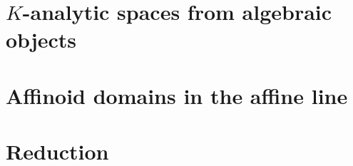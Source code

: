 \section{$K$-analytic spaces from algebraic objects} \label{sec:berkovich_analytification_of_schemes}



\section{Affinoid domains in the affine line} \label{sec:analytification_of_curves}




\section{Reduction} \label{sec:reduction}




